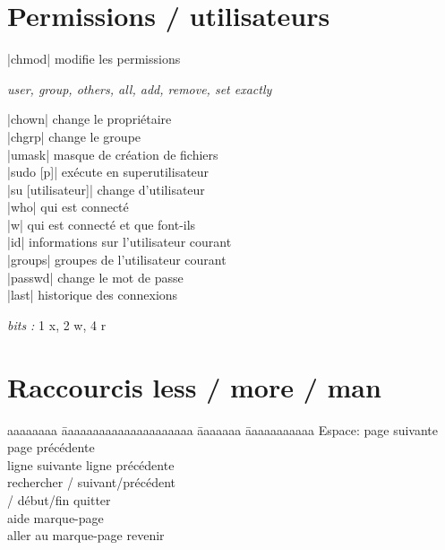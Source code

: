 \documentclass{article}
\let\oldkeys\keys
\renewcommand{\keys}[1]{\small\oldkeys{#1}\normalsize}
\newenvironment{cmdblock}{%
  \par\setlength{\parindent}{0pt}\setlength{\parskip}{0pt}%
  \RaggedRight%
}{\par}
\newlength{\cmdoptindent}
\newcommand{\cmdopt}[1]{%
  \hspace*{\cmdoptindent}%
  \begin{minipage}[t]{\dimexpr\linewidth-\cmdoptindent\relax}
    \RaggedRight \itshape #1%
  \end{minipage}\par
}
\begin{document}
\begin{multicols}{4}
    \section*{Permissions / utilisateurs}

    \begin{cmdblock}
        \code|chmod| \quad modifie les permissions \\
        \cmdopt{ user,  group,  others,  all,
            \codx{+} add, \codx{-} remove, \codx{=} set exactly}
        \code|chown| \quad change le propriétaire \\
        \code|chgrp| \quad change le groupe \\
        \code|umask| \quad masque de création de fichiers \\
        \code|sudo [p]| \quad exécute en superutilisateur \\
        \code|su [utilisateur]| \quad change d'utilisateur \\
        \code|who| \quad qui est connecté \\
        \code|w| \quad qui est connecté et que font-ils \\
        \code|id| \quad informations sur l'utilisateur courant \\
        \code|groups| \quad groupes de l'utilisateur courant \\
        \code|passwd| \quad change le mot de passe \\
        \code|last| \quad historique des connexions
    \end{cmdblock}

    \textit{bits :} 1 x, 2 w, 4 r

    \section*{Raccourcis less / more / man}
    \begin{tabbing}
        aaaaaaaa \= aaaaaaaaaaaaaaaaaaaaa \= aaaaaaa \= aaaaaaaaaaa \kill
         \> Espace: page suivante \>   \>  page précédente \\
        \keys{\return}{} \>  ligne suivante \>   \>  ligne précédente \\
        \keys{/} \>  rechercher \> / \>  suivant/précédent \\
        / \>  début/fin \>   \>  quitter \\
         \>  aide \>   \>  marque-page \\
         \>  aller au marque-page \>   \>  revenir
    \end{tabbing}



\end{multicols}
\end{document}
